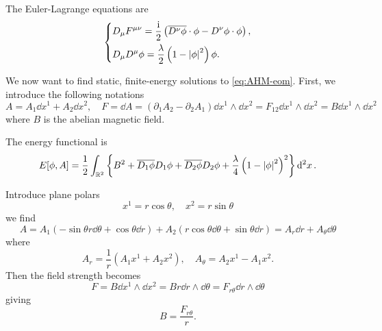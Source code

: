 \documentclass[a4paper,11pt]{article}
\begin{document}
    The Euler-Lagrange equations are 
    \begin{equation}
        \begin{dcases}
            D_\mu F^{\mu \nu} = \frac{\mathrm{i}}{2} \left( \overline{D^\nu \phi} \cdot \phi - D^\nu \phi \cdot \phi \right),\\
            D_\mu D^\mu \phi = \frac{\lambda}{2} \left( 1 - \abs{\phi}^2 \right) \phi.
        \end{dcases}
        \label{eq:AHM-eom}
    \end{equation}

    We now want to find static, finite-energy solutions to \eqref{eq:AHM-eom}. First, we introduce the following notations 
    \begin{equation}
        A = A_1 \dd{x^1} + A_2 \dd{x^2}, \quad F = \dd{A} = (\partial_1 A_2 - \partial_2 A_1) \dd{x^1} \wedge \dd{x^2} = F_{12} \dd{x^1} \wedge \dd{x^2} = B \dd{x^1} \wedge \dd{x^2}
    \end{equation}
    where $B$ is the abelian magnetic field. 

    The energy functional is 
    \begin{equation}
        E[\phi,A] = \frac{1}{2} \int_{\mathbb{R}^2}\left\{ B^2 + \overline{D_1 \phi} D_1 \phi + \overline{D_2 \phi} D_2 \phi + \frac{\lambda}{4}\left( 1 - \abs{\phi}^2 \right)^2 \right\} \dd[2]{x}. \label{eq:vtx-E}
    \end{equation}

    Introduce plane polars 
    \begin{equation}
        x^1 = r \cos \theta, \quad x^2 = r \sin \theta
    \end{equation} 
    we find 
    \begin{equation}
        A = A_1(-\sin \theta r \dd{\theta} + \cos \theta \dd{r}) + A_2 (r \cos \theta \dd{\theta} + \sin \theta \dd{r}) = A_r \dd{r} + A_\theta \dd{\theta}
    \end{equation}
    where 
    \begin{equation}
        A_r = \frac{1}{r} \left( A_1 x^1 + A_2 x^2 \right), \quad A_\theta = A_2 x^1 - A_1 x^2.
    \end{equation}
    Then the field strength becomes 
    \begin{equation}
        F = B \dd{x^1} \wedge \dd{x^2} = B r \dd{r} \wedge \dd{\theta} = F_{r \theta} \dd{r} \wedge \dd{\theta}
    \end{equation}
    giving 
    \begin{equation}
        B = \frac{F_{r \theta}}{r}.
    \end{equation}
\end{document}
